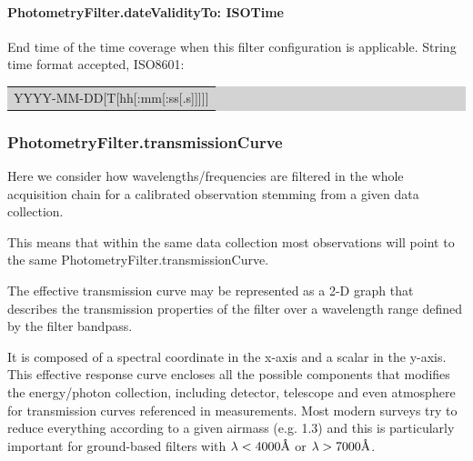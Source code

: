\documentclass[11pt,a4paper]{ivoa}
\newcommand{\angstrom}{\mbox{\normalfont\AA}}
\begin{document}

\paragraph{PhotometryFilter.dateValidityTo: ISOTime}
End time of the time coverage when this filter configuration is applicable. String time format accepted, ISO8601:\par


\bigskip
\par
\begingroup\setlength{\fboxsep}{0pt}
\colorbox{lightgray}{%
\begin{tabular}{|p{5.53in}|}
YYYY-MM-DD[T[hh[:mm[:ss[.s]]]]]
\end{tabular}%
}\endgroup
\par
\bigskip


\subsubsection{PhotometryFilter.transmissionCurve}
Here we consider how wavelengths/frequencies are filtered in the whole acquisition chain for a calibrated observation stemming from a given data collection.
\par

This means that within the same data collection most observations will point to the same PhotometryFilter.transmissionCurve.
\par

The effective transmission curve may be represented as a 2-D graph that describes the transmission properties of the filter over a wavelength range defined by the filter bandpass.
\par

It is composed of a spectral coordinate in the x-axis and a scalar in the y-axis. This effective response curve encloses all the possible components that modifies the energy/photon collection, including detector, telescope and even atmosphere for transmission curves referenced in measurements. Most modern surveys try to reduce everything according to a given airmass (e.g. 1.3) and this is particularly important for ground-based filters with $\lambda < 4000 \angstrom $ or  $\lambda > 7000 \angstrom $.
\par
\end{document}
